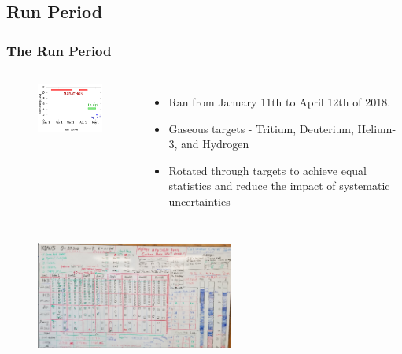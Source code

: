 \documentclass[12pt]{beamer}
\begin{document}
\subsection[Run Period]{Run Period}
\begin{frame}
\frametitle{The Run Period}
\vspace{-20pt}
\begin{columns}
	\begin{figure}
		\includegraphics[width=4.5cm]{../images/run_per}
	\end{figure}
	\vspace{-10pt}
	\begin{itemize}
		\item Ran from January 11th to April 12th of 2018.
		\item Gaseous targets - Tritium, Deuterium, Helium-3, and Hydrogen
		\item Rotated through targets to achieve equal statistics and reduce the impact of systematic uncertainties
	\end{itemize}
\end{columns}
\begin{figure}
	\includegraphics[width=6.5cm]{../images/whiteboard_2_20}
\end{figure}
\end{frame}
\end{document}
